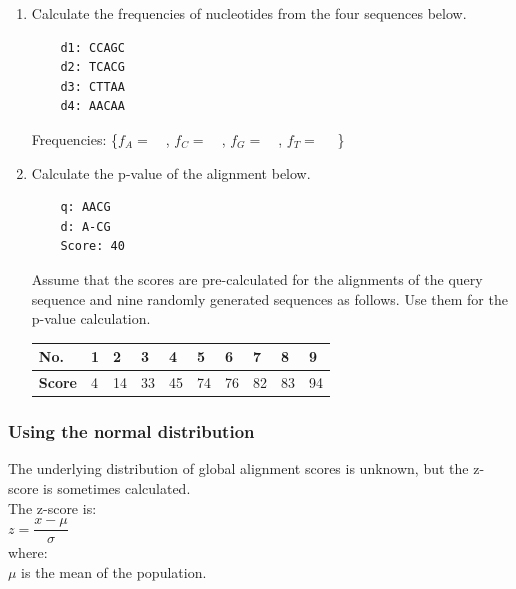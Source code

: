 \begin{enumerate}
\item Calculate the frequencies of nucleotides from the four sequences below.

\begin{verbatim}
    d1: CCAGC
    d2: TCACG
    d3: CTTAA
    d4: AACAA
\end{verbatim}

Frequencies: \{$f_{A} = \quad$, $f_{C} = \quad$, $f_{G} =  \quad$, $f_{T} =  \quad$ \}

\item Calculate the p-value of the alignment below. 

\begin{verbatim}
    q: AACG
    d: A-CG
    Score: 40
\end{verbatim}

\noindent
Assume that the scores are pre-calculated for the alignments of the query sequence and nine randomly generated sequences as follows. Use them for the p-value calculation.

\begin{table}[H]
\centering
\small
\begin{tabular}{|l|l|l|l|l|l|l|l|l|l|}
\hline
\textbf{No.}   & 1 & 2  & 3  & 4  & 5  & 6  & 7  & 8  & 9  \\ \hline
\textbf{Score} & 4 & 14 & 33 & 45 & 74 & 76 & 82 & 83 & 94 \\ \hline
\end{tabular}
\end{table}


\end{enumerate}

%
%
\subsubsection*{Using the normal distribution}
The underlying distribution of global alignment scores is unknown, but the z-score is sometimes calculated. \\

\noindent
The z-score is: \\

$z = \dfrac{x-\mu}{\sigma}$ \\

\noindent
where: \\

$\mu$ is the mean of the population. \\

